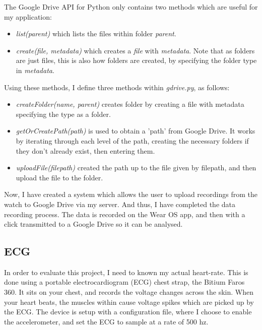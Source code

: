 \documentclass[12pt,a4paper,twoside,openright]{report}
\begin{document}
The Google Drive API for Python only contains two methods which are useful for
my application:

\begin{itemize}
	\item \emph{list(parent)} which lists the files within folder
		\emph{parent}.

	\item \emph{create(file, metadata)} which creates a \emph{file} with
		\emph{metadata}. Note that as folders
		are just files, this is also how folders are created, by
		specifying the folder type in \emph{metadata}.
\end{itemize}

Using these methods, I define three methods within \emph{gdrive.py}, as follows:

\begin{itemize}
	\item \emph{createFolder(name, parent)} creates folder by creating a
		file with metadata specifying the type as a folder.

	\item \emph{getOrCreatePath(path)} is used to obtain a 'path' from Google
		Drive. It works by iterating through each level of the path,
		creating the necessary folders if they don't already exist,
		then entering them.

	\item \emph{uploadFile(filepath)} created the path up to the file
		given by filepath, and then upload the file to the folder.
\end{itemize}

Now, I have created a system which allows the user to upload recordings from
the watch to Google Drive via my server. And thus, I have completed the data
recording process. The data is recorded on the Wear OS app, and then with a
click transmitted to a Google Drive so it can be analysed.


\subsection{ECG}

In order to evaluate this project, I need to known my actual heart-rate. This
is done using a portable electrocardiogram (ECG) chest strap, the Bitium Faros
360. It sits on your chest, and records the voltage changes across the skin.
When your heart beats, the muscles within cause voltage spikes which are
picked up by the ECG. The device is setup with a configuration 
file, where I choose to enable
the accelerometer, and set the ECG to sample at a rate of 500 hz.
\end{document}

